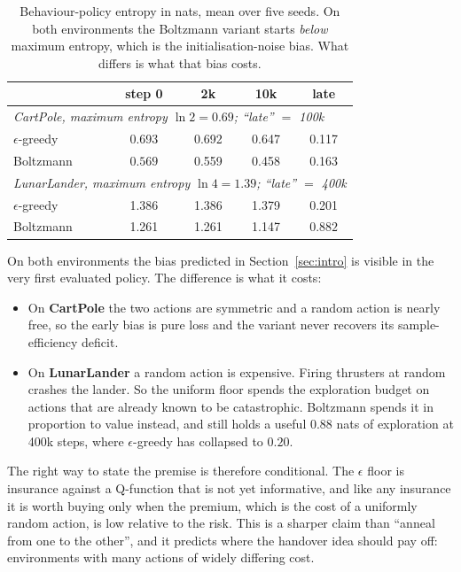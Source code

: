 \documentclass[11pt,a4paper]{article}
\begin{document}
\begin{table}[h]
\centering
\small
\caption{Behaviour-policy entropy in nats, mean over five seeds. On both
environments the Boltzmann variant starts \emph{below} maximum entropy, which
is the initialisation-noise bias. What differs is what that bias costs.}
\label{tab:entropy}
\begin{tabular}{lcccc}
\toprule
& step 0 & 2k & 10k & late \\
\midrule
\multicolumn{5}{l}{\textit{CartPole, maximum entropy $\ln 2 = 0.69$; ``late'' $=$ 100k}}\\
$\epsilon$-greedy & 0.693 & 0.692 & 0.647 & 0.117 \\
Boltzmann & $\mathbf{0.569}$ & 0.559 & 0.458 & 0.163 \\
\midrule
\multicolumn{5}{l}{\textit{LunarLander, maximum entropy $\ln 4 = 1.39$; ``late'' $=$ 400k}}\\
$\epsilon$-greedy & 1.386 & 1.386 & 1.379 & 0.201 \\
Boltzmann & 1.261 & 1.261 & 1.147 & $\mathbf{0.882}$ \\
\bottomrule
\end{tabular}
\end{table}

On both environments the bias predicted in Section~\ref{sec:intro} is visible
in the very first evaluated policy. The difference is what it costs:

\begin{itemize}
\item On \textbf{CartPole} the two actions are symmetric and a random action is
      nearly free, so the early bias is pure loss and the variant never
      recovers its sample-efficiency deficit.
\item On \textbf{LunarLander} a random action is expensive. Firing thrusters at
      random crashes the lander. So the uniform floor spends the exploration
      budget on actions that are already known to be catastrophic. Boltzmann
      spends it in proportion to value instead, and still holds a useful
      $0.88$ nats of exploration at 400k steps, where $\epsilon$-greedy has
      collapsed to $0.20$.
\end{itemize}

The right way to state the premise is therefore conditional. The $\epsilon$
floor is insurance against a Q-function that is not yet informative, and like
any insurance it is worth buying only when the premium, which is the cost of a
uniformly random action, is low relative to the risk. This is a sharper claim
than ``anneal from one to the other'', and it predicts where the handover idea
should pay off: environments with many actions of widely differing cost.
\end{document}
